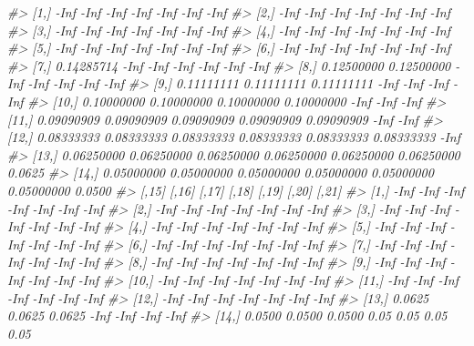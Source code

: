 \documentclass[
]{book}
\newenvironment{Shaded}{\begin{snugshade}}{\end{snugshade}}
\newcommand{\CommentTok}[1]{\textcolor[rgb]{0.56,0.35,0.01}{\textit{#1}}}
\begin{document}
\begin{Shaded}
\begin{Highlighting}[]
\CommentTok{\#\textgreater{}  [1,]       {-}Inf       {-}Inf       {-}Inf       {-}Inf       {-}Inf       {-}Inf   {-}Inf}
\CommentTok{\#\textgreater{}  [2,]       {-}Inf       {-}Inf       {-}Inf       {-}Inf       {-}Inf       {-}Inf   {-}Inf}
\CommentTok{\#\textgreater{}  [3,]       {-}Inf       {-}Inf       {-}Inf       {-}Inf       {-}Inf       {-}Inf   {-}Inf}
\CommentTok{\#\textgreater{}  [4,]       {-}Inf       {-}Inf       {-}Inf       {-}Inf       {-}Inf       {-}Inf   {-}Inf}
\CommentTok{\#\textgreater{}  [5,]       {-}Inf       {-}Inf       {-}Inf       {-}Inf       {-}Inf       {-}Inf   {-}Inf}
\CommentTok{\#\textgreater{}  [6,]       {-}Inf       {-}Inf       {-}Inf       {-}Inf       {-}Inf       {-}Inf   {-}Inf}
\CommentTok{\#\textgreater{}  [7,] 0.14285714       {-}Inf       {-}Inf       {-}Inf       {-}Inf       {-}Inf   {-}Inf}
\CommentTok{\#\textgreater{}  [8,] 0.12500000 0.12500000       {-}Inf       {-}Inf       {-}Inf       {-}Inf   {-}Inf}
\CommentTok{\#\textgreater{}  [9,] 0.11111111 0.11111111 0.11111111       {-}Inf       {-}Inf       {-}Inf   {-}Inf}
\CommentTok{\#\textgreater{} [10,] 0.10000000 0.10000000 0.10000000 0.10000000       {-}Inf       {-}Inf   {-}Inf}
\CommentTok{\#\textgreater{} [11,] 0.09090909 0.09090909 0.09090909 0.09090909 0.09090909       {-}Inf   {-}Inf}
\CommentTok{\#\textgreater{} [12,] 0.08333333 0.08333333 0.08333333 0.08333333 0.08333333 0.08333333   {-}Inf}
\CommentTok{\#\textgreater{} [13,] 0.06250000 0.06250000 0.06250000 0.06250000 0.06250000 0.06250000 0.0625}
\CommentTok{\#\textgreater{} [14,] 0.05000000 0.05000000 0.05000000 0.05000000 0.05000000 0.05000000 0.0500}
\CommentTok{\#\textgreater{}        [,15]  [,16]  [,17] [,18] [,19] [,20] [,21]}
\CommentTok{\#\textgreater{}  [1,]   {-}Inf   {-}Inf   {-}Inf  {-}Inf  {-}Inf  {-}Inf  {-}Inf}
\CommentTok{\#\textgreater{}  [2,]   {-}Inf   {-}Inf   {-}Inf  {-}Inf  {-}Inf  {-}Inf  {-}Inf}
\CommentTok{\#\textgreater{}  [3,]   {-}Inf   {-}Inf   {-}Inf  {-}Inf  {-}Inf  {-}Inf  {-}Inf}
\CommentTok{\#\textgreater{}  [4,]   {-}Inf   {-}Inf   {-}Inf  {-}Inf  {-}Inf  {-}Inf  {-}Inf}
\CommentTok{\#\textgreater{}  [5,]   {-}Inf   {-}Inf   {-}Inf  {-}Inf  {-}Inf  {-}Inf  {-}Inf}
\CommentTok{\#\textgreater{}  [6,]   {-}Inf   {-}Inf   {-}Inf  {-}Inf  {-}Inf  {-}Inf  {-}Inf}
\CommentTok{\#\textgreater{}  [7,]   {-}Inf   {-}Inf   {-}Inf  {-}Inf  {-}Inf  {-}Inf  {-}Inf}
\CommentTok{\#\textgreater{}  [8,]   {-}Inf   {-}Inf   {-}Inf  {-}Inf  {-}Inf  {-}Inf  {-}Inf}
\CommentTok{\#\textgreater{}  [9,]   {-}Inf   {-}Inf   {-}Inf  {-}Inf  {-}Inf  {-}Inf  {-}Inf}
\CommentTok{\#\textgreater{} [10,]   {-}Inf   {-}Inf   {-}Inf  {-}Inf  {-}Inf  {-}Inf  {-}Inf}
\CommentTok{\#\textgreater{} [11,]   {-}Inf   {-}Inf   {-}Inf  {-}Inf  {-}Inf  {-}Inf  {-}Inf}
\CommentTok{\#\textgreater{} [12,]   {-}Inf   {-}Inf   {-}Inf  {-}Inf  {-}Inf  {-}Inf  {-}Inf}
\CommentTok{\#\textgreater{} [13,] 0.0625 0.0625 0.0625  {-}Inf  {-}Inf  {-}Inf  {-}Inf}
\CommentTok{\#\textgreater{} [14,] 0.0500 0.0500 0.0500  0.05  0.05  0.05  0.05}
\end{Highlighting}
\end{Shaded}
\end{document}
